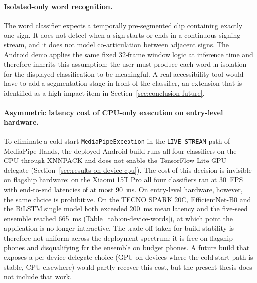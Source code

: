 \paragraph{Isolated-only word recognition.}
The word classifier expects a temporally pre-segmented clip
containing exactly one sign. It does not detect when a sign
starts or ends in a continuous signing stream, and it does not
model co-articulation between adjacent signs. The Android demo
applies the same fixed 32-frame window logic at inference time
and therefore inherits this assumption: the user must produce
each word in isolation for the displayed classification to be
meaningful. A real accessibility tool would have to add a
segmentation stage in front of the classifier, an extension that
is identified as a high-impact item in
Section~\ref{sec:conclusion-future}.

\paragraph{Asymmetric latency cost of CPU-only execution on
entry-level hardware.}
To eliminate a cold-start \texttt{MediaPipeException} in the
\texttt{LIVE\_STREAM} path of MediaPipe Hands, the deployed Android
build runs all four classifiers on the CPU through XNNPACK and does
not enable the TensorFlow Lite GPU delegate
(Section~\ref{sec:results-on-device-cpu}). The cost of this decision
is invisible on flagship hardware: on the Xiaomi 15T Pro all four
classifiers ran at \SI{30}{FPS} with end-to-end latencies of at most
\SI{90}{ms}. On entry-level hardware, however, the same choice is
prohibitive. On the
TECNO SPARK 20C, EfficientNet-B0 and the BiLSTM single model both
exceeded \SI{200}{ms} mean latency and the five-seed ensemble
reached \SI{665}{ms} (Table~\ref{tab:on-device-words}), at which
point the application is no longer interactive. The trade-off taken
for build stability is therefore not uniform across the deployment
spectrum: it is free on flagship phones and disqualifying for the
ensemble on budget phones. A future build that exposes a per-device
delegate choice (GPU on devices where the cold-start path is stable,
CPU elsewhere) would partly recover this cost, but the present
thesis does not include that work.

